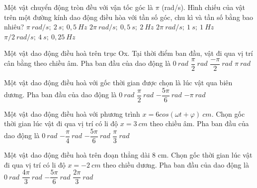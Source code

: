 
\begin{vidu}
Một vật chuyển động tròn đều với vận tốc góc là $\pi$ (rad/s). Hình chiếu của vật trên một đường kính dao động điều hòa với tần số góc, chu kì và tần số bằng bao nhiêu?
\choice
{\True $\pi\ rad / s ;\ 2 \ s ;\ 0,5 \ Hz$}
{$2 \pi\ rad / s ;\ 0,5 \ s ;\ 2 \ Hz$}
{$2 \pi\ rad / s ;\ 1 \ s ;\ 1 \ Hz$}
{$\pi / 2\ rad / s ;\ 4 \ s ;\ 0,25 \ Hz$}
\end{vidu}
\begin{vidu}
Một vật dao động điều hoà trên trục Ox. Tại thời điểm ban đầu, vật đi qua vị trí cân bằng theo chiều âm. Pha ban đầu của dao động là
\choice
{$0\ rad$}
{\True $\dfrac{\pi}{2}\ rad$}
{$\dfrac{-\pi}{2}\ rad$}
{$\pi\ rad$}
\end{vidu}
\begin{vidu}
Một vật dao động điều hoà với gốc thời gian được chọn là lúc vật qua biên dương. Pha ban đầu của dao động là
\choice
{\True $0\ rad$}
{$\dfrac{\pi}{2}\ rad$}
{$-\dfrac{5\pi}{6}\ rad$}
{$-\pi\ rad$}
\end{vidu}
\begin{vidu}
Một vật dao động điều hoà với phương trình $x=6cos(\omega t+\varphi)\ cm$. Chọn gốc thời gian lúc vật đi qua vị trí có li độ $x=3\ cm$ theo chiều âm. Pha ban đầu của dao động là
\choice
{$0\ rad$}
{$-\dfrac{\pi}{4}\ rad$}
{$-\dfrac{5\pi}{6}\ rad$}
{\True $\dfrac{\pi}{3}\ rad$}
\end{vidu}
\begin{vidu}
Một vật dao động điều hoà trên đoạn thẳng dài 8 cm. Chọn gốc thời gian lúc vật đi qua vị trí có li độ $x=-2\ cm$ theo chiều dương. Pha ban đầu của dao động là
\choice
{$0\ rad$}
{\True $\dfrac{4\pi}{3}\ rad$}
{$-\dfrac{5\pi}{6}\ rad$}
{$\dfrac{2\pi}{3}\ rad$}
\end{vidu}
